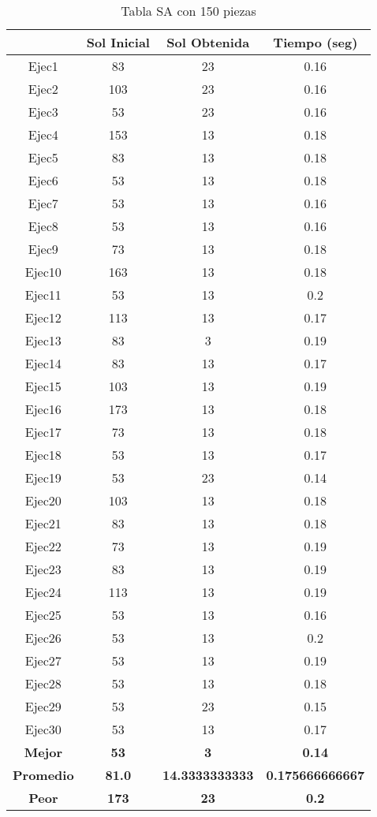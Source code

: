 \pagestyle{empty}


\begin{center}

\begin{table}

\begin{tabular}{|c|c|c|c|}
\hline
 & {\bf Sol Inicial} & {\bf Sol Obtenida} & {\bf Tiempo (seg)} \\
\hline
Ejec1 & 83 & 23  & 0.16 \\
\hline
Ejec2 & 103 & 23  & 0.16 \\
\hline
Ejec3 & 53 & 23  & 0.16 \\
\hline
Ejec4 & 153 & 13  & 0.18 \\
\hline
Ejec5 & 83 & 13  & 0.18 \\
\hline
Ejec6 & 53 & 13  & 0.18 \\
\hline
Ejec7 & 53 & 13  & 0.16 \\
\hline
Ejec8 & 53 & 13  & 0.16 \\
\hline
Ejec9 & 73 & 13  & 0.18 \\
\hline
Ejec10 & 163 & 13  & 0.18 \\
\hline
Ejec11 & 53 & 13  & 0.2 \\
\hline
Ejec12 & 113 & 13  & 0.17 \\
\hline
Ejec13 & 83 & 3  & 0.19 \\
\hline
Ejec14 & 83 & 13  & 0.17 \\
\hline
Ejec15 & 103 & 13  & 0.19 \\
\hline
Ejec16 & 173 & 13  & 0.18 \\
\hline
Ejec17 & 73 & 13  & 0.18 \\
\hline
Ejec18 & 53 & 13  & 0.17 \\
\hline
Ejec19 & 53 & 23  & 0.14 \\
\hline
Ejec20 & 103 & 13  & 0.18 \\
\hline
Ejec21 & 83 & 13  & 0.18 \\
\hline
Ejec22 & 73 & 13  & 0.19 \\
\hline
Ejec23 & 83 & 13  & 0.19 \\
\hline
Ejec24 & 113 & 13  & 0.19 \\
\hline
Ejec25 & 53 & 13  & 0.16 \\
\hline
Ejec26 & 53 & 13  & 0.2 \\
\hline
Ejec27 & 53 & 13  & 0.19 \\
\hline
Ejec28 & 53 & 13  & 0.18 \\
\hline
Ejec29 & 53 & 23  & 0.15 \\
\hline
Ejec30 & 53 & 13  & 0.17 \\
\hline
{\bf Mejor} & {\bf 53} & {\bf 3} & {\bf 0.14} \\
\hline
{\bf Promedio} & {\bf 81.0} & {\bf 14.3333333333} & {\bf 0.175666666667} \\
\hline
{\bf Peor} & {\bf 173} & {\bf 23} & {\bf 0.2} \\
\hline
\end{tabular}
\caption{Tabla SA con 150 piezas}
\end{table}


\end{center}
